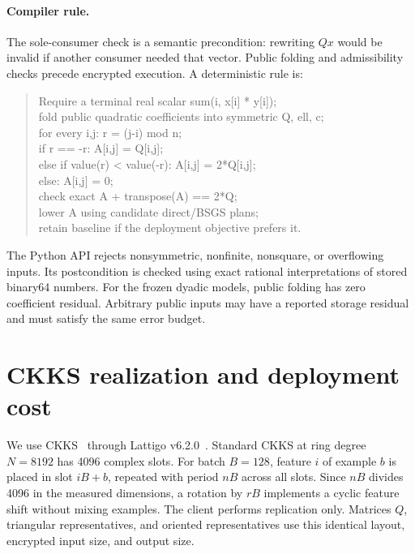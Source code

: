 \documentclass[10pt]{article}
\begin{document}
\paragraph{Compiler rule.}
The sole-consumer check is a semantic precondition: rewriting $Qx$ would be invalid if another consumer needed that vector. Public folding and admissibility checks precede encrypted execution. A deterministic rule is:
\begin{quote}\small\ttfamily
Require a terminal real scalar sum(i, x[i] * y[i]);\\
fold public quadratic coefficients into symmetric Q, ell, c;\\
for every i,j: r = (j-i) mod n;\\
\hspace*{1em}if r == -r: A[i,j] = Q[i,j];\\
\hspace*{1em}else if value(r) < value(-r): A[i,j] = 2*Q[i,j];\\
\hspace*{1em}else: A[i,j] = 0;\\
check exact A + transpose(A) == 2*Q;\\
lower A using candidate direct/BSGS plans;\\
retain baseline if the deployment objective prefers it.
\end{quote}
The Python API rejects nonsymmetric, nonfinite, nonsquare, or overflowing inputs. Its postcondition is checked using exact rational interpretations of stored binary64 numbers. For the frozen dyadic models, public folding has zero coefficient residual. Arbitrary public inputs may have a reported storage residual and must satisfy the same error budget.

\section{CKKS realization and deployment cost}\label{sec:ckks}
We use CKKS~\citep{ckks} through Lattigo v6.2.0~\citep{lattigo}. Standard CKKS at ring degree $N=8192$ has 4096 complex slots. For batch $B=128$, feature $i$ of example $b$ is placed in slot $iB+b$, repeated with period $nB$ across all slots. Since $nB$ divides 4096 in the measured dimensions, a rotation by $rB$ implements a cyclic feature shift without mixing examples. The client performs replication only. Matrices $Q$, triangular representatives, and oriented representatives use this identical layout, encrypted input size, and output size.
\end{document}
